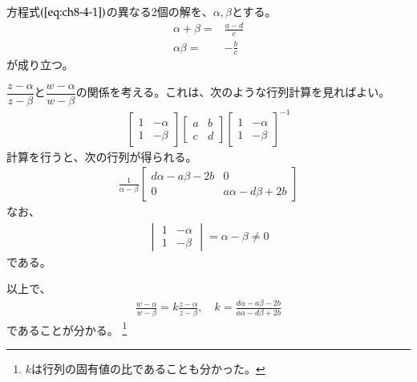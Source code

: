 方程式$(\ref{eq:ch8-4-1})$の異なる2個の解を、$\alpha,\beta$とする。
\begin{align*}
    \alpha+\beta=&\frac{a-d}{c}\\
    \alpha\beta=&-\frac{b}{c}
\end{align*}
が成り立つ。

$\dfrac{z-\alpha}{z-\beta}$と$\dfrac{w-\alpha}{w-\beta}$の関係を考える。これは、次のような行列計算を見ればよい。
\begin{align*}
    \begin{bmatrix}
        1&-\alpha\\
        1&-\beta
    \end{bmatrix}
    \begin{bmatrix}
        a&b\\
        c&d
    \end{bmatrix}
    \begin{bmatrix}
        1&-\alpha\\
        1&-\beta
    \end{bmatrix}^{-1}
\end{align*}
計算を行うと、次の行列が得られる。
\begin{align*}
    \frac{1}{\alpha-\beta}
    \begin{bmatrix}
        d\alpha-a\beta-2b&0\\
        0&a\alpha-d\beta+2b
    \end{bmatrix}
\end{align*}
なお、
\begin{align*}
    \begin{vmatrix}
        1&-\alpha\\
        1&-\beta
    \end{vmatrix}
    =\alpha-\beta\neq0
\end{align*}
である。

以上で、
\begin{align*}
    \frac{w-\alpha}{w-\beta}
    =k\frac{z-\alpha}{z-\beta},\quad
    k=\frac{d\alpha-a\beta-2b}{a\alpha-d\beta+2b}
\end{align*}
であることが分かる。
\footnote{$k$は行列の固有値の比であることも分かった。}

